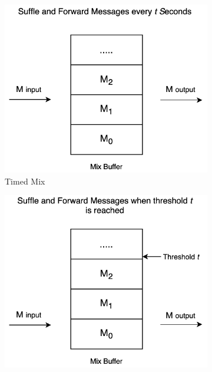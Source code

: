 \documentclass[logo,msc,cyber]{infthesis}   %
\begin{document}
\begin{figure}[h!]
   \centering
   \begin{subfigure}[b]{0.45\textwidth}
       \centering
       \includegraphics[width=\textwidth]{figures/mixing_techniques/timed.png}
       \caption{Timed Mix}
       \label{fig:Timed Mix}
   \end{subfigure}
   \hfill
   \begin{subfigure}[b]{0.45\textwidth}
       \centering
       \includegraphics[width=\textwidth]{figures/mixing_techniques/threshold.png}

\end{subfigure}
\end{figure}
\end{document}
